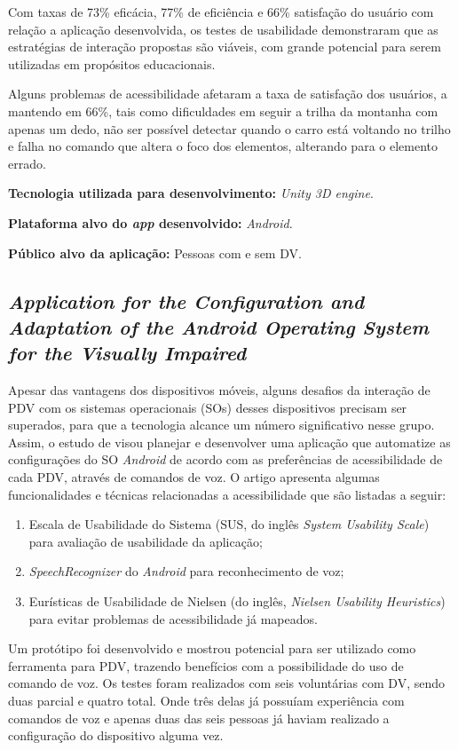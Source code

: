 Com taxas de 73\% eficácia, 77\% de eficiência e 66\% satisfação do usuário com relação a aplicação desenvolvida, os testes de usabilidade demonstraram que as estratégias de interação propostas são viáveis, com grande potencial para serem utilizadas em propósitos educacionais.

Alguns problemas de acessibilidade afetaram a taxa de satisfação dos usuários, a mantendo em 66\%, tais como dificuldades em seguir a trilha da montanha com apenas um dedo, não ser possível detectar quando o carro está voltando no trilho e falha no comando que altera o foco dos elementos, alterando para o elemento errado.

\textbf{Tecnologia utilizada para desenvolvimento:} \emph{Unity 3D engine}.

\textbf{Plataforma alvo do \emph{app} desenvolvido:} \emph{Android}.

\textbf{Público alvo da aplicação:} Pessoas com e sem DV\@.

\subsection{\emph{Application for the Configuration and Adaptation of the Android Operating System for the Visually Impaired}}

Apesar das vantagens dos dispositivos móveis, alguns desafios da interação de PDV com os sistemas operacionais (SOs) desses dispositivos precisam ser superados, para que a tecnologia alcance um número significativo nesse grupo.
Assim, o estudo de  visou planejar e desenvolver uma aplicação que automatize as configurações do SO \emph{Android} de acordo com as preferências de acessibilidade de cada PDV, através de comandos de voz.
O artigo apresenta algumas funcionalidades e técnicas relacionadas a acessibilidade que são listadas a seguir:

\begin{enumerate}
    \item Escala de Usabilidade do Sistema (SUS, do inglês \emph{System Usability Scale}) para avaliação de usabilidade da aplicação;
    \item \emph{SpeechRecognizer} do \emph{Android} para reconhecimento de voz;
    \item Eurísticas de Usabilidade de Nielsen (do inglês, \emph{Nielsen Usability Heuristics}) para evitar problemas de acessibilidade já mapeados.
\end{enumerate}

Um protótipo foi desenvolvido e mostrou potencial para ser utilizado como ferramenta para PDV, trazendo benefícios com a possibilidade do uso de comando de voz.
Os testes foram realizados com seis voluntárias com DV, sendo duas parcial e quatro total.
Onde três delas já possuíam experiência com comandos de voz e apenas duas das seis pessoas já haviam realizado a configuração do dispositivo alguma vez.


